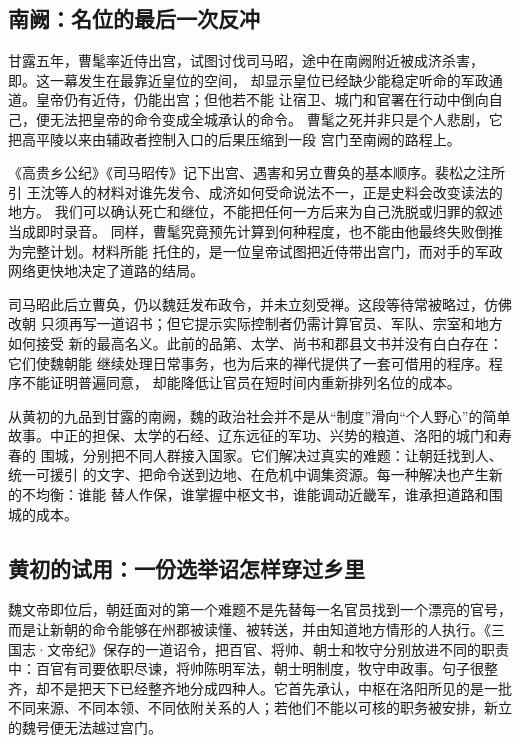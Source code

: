 \subsection{南阙：名位的最后一次反冲}

甘露五年，曹髦率近侍出宫，试图讨伐司马昭，途中在南阙附近被成济杀害，
即。这一幕发生在最靠近皇位的空间，
却显示皇位已经缺少能稳定听命的军政通道。皇帝仍有近侍，仍能出宫；但他若不能
让宿卫、城门和官署在行动中倒向自己，便无法把皇帝的命令变成全城承认的命令。
曹髦之死并非只是个人悲剧，它把高平陵以来由辅政者控制入口的后果压缩到一段
宫门至南阙的路程上。

《高贵乡公纪》《司马昭传》记下出宫、遇害和另立曹奂的基本顺序。裴松之注所引
王沈等人的材料对谁先发令、成济如何受命说法不一，正是史料会改变读法的地方。
我们可以确认死亡和继位，不能把任何一方后来为自己洗脱或归罪的叙述当成即时录音。
同样，曹髦究竟预先计算到何种程度，也不能由他最终失败倒推为完整计划。材料所能
托住的，是一位皇帝试图把近侍带出宫门，而对手的军政网络更快地决定了道路的结局。

司马昭此后立曹奂，仍以魏廷发布政令，并未立刻受禅。这段等待常被略过，仿佛改朝
只须再写一道诏书；但它提示实际控制者仍需计算官员、军队、宗室和地方如何接受
新的最高名义。此前的品第、太学、尚书和郡县文书并没有白白存在：它们使魏朝能
继续处理日常事务，也为后来的禅代提供了一套可借用的程序。程序不能证明普遍同意，
却能降低让官员在短时间内重新排列名位的成本。

从黄初的九品到甘露的南阙，魏的政治社会并不是从“制度”滑向“个人野心”的简单
故事。中正的担保、太学的石经、辽东远征的军功、兴势的粮道、洛阳的城门和寿春的
围城，分别把不同人群接入国家。它们解决过真实的难题：让朝廷找到人、统一可援引
的文字、把命令送到边地、在危机中调集资源。每一种解决也产生新的不均衡：谁能
替人作保，谁掌握中枢文书，谁能调动近畿军，谁承担道路和围城的成本。

\subsection{黄初的试用：一份选举诏怎样穿过乡里}

魏文帝即位后，朝廷面对的第一个难题不是先替每一名官员找到一个漂亮的官号，而是让新朝的命令能够在州郡被读懂、被转送，并由知道地方情形的人执行。《三国志·文帝纪》保存的一道诏令，把百官、将帅、朝士和牧守分别放进不同的职责中：百官有司要依职尽谏，将帅陈明军法，朝士明制度，牧守申政事。句子很整齐，却不是把天下已经整齐地分成四种人。它首先承认，中枢在洛阳所见的是一批不同来源、不同本领、不同依附关系的人；若他们不能以可核的职务被安排，新立的魏号便无法越过宫门。


